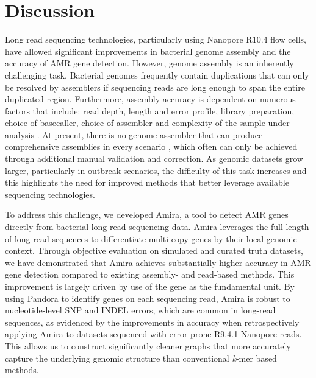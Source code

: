 \section*{Discussion}

Long read sequencing technologies, particularly using Nanopore R10.4 flow cells, have allowed significant improvements in bacterial genome assembly and the accuracy of AMR gene detection. However, genome assembly is an inherently challenging task. Bacterial genomes frequently contain duplications that can only be resolved by assemblers if sequencing reads are long enough to span the entire duplicated region. Furthermore, assembly accuracy is dependent on numerous factors that include: read depth, length and error profile, library preparation, choice of basecaller, choice of assembler and complexity of the sample under analysis \cite{FosterNyarko2023}. At present, there is no genome assembler that can produce comprehensive assemblies in every scenario \cite{10.12688/f1000research.21782.1}, which often can only be achieved through additional manual validation and correction. As genomic datasets grow larger, particularly in outbreak scenarios, the difficulty of this task increases and this highlights the need for improved methods that better leverage available sequencing technologies.

To address this challenge, we developed Amira, a tool to detect AMR genes directly from bacterial long-read sequencing data. Amira leverages the full length of long read sequences to differentiate multi-copy genes by their local genomic context. Through objective evaluation on simulated and curated truth datasets, we have demonstrated that Amira achieves substantially higher accuracy in AMR gene detection compared to existing assembly- and read-based methods. This improvement is largely driven by use of the gene as the fundamental unit. By using Pandora to identify genes on each sequencing read, Amira is robust to nucleotide-level SNP and INDEL errors, which are common in long-read sequences, as evidenced by the improvements in accuracy when retrospectively applying Amira to datasets sequenced with error-prone R9.4.1 Nanopore reads. This allows us to construct significantly cleaner graphs that more accurately capture the underlying genomic structure than conventional \textit{k}-mer based methods. 

